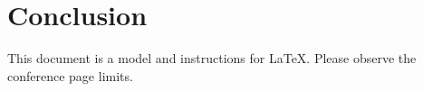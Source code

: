 
\section{Conclusion}
This document is a model and instructions for LaTeX.
Please observe the conference page limits.
